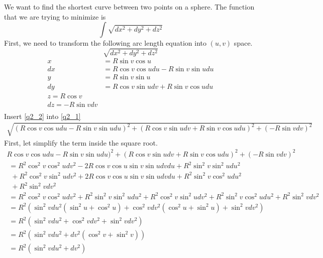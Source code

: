 We want to find the shortest curve between two points on a sphere. The function that we are trying to minimize is
\begin{equation}
\int \sqrt{dx^2 + dy^2 + dz^2}
\end{equation}
First, we need to transform the following arc length equation into $(u,v)$ space.
\begin{equation}\label{q2_1}
\sqrt{dx^2 + dy^2 + dz^2}
\end{equation}
\begin{equation}\label{q2_2}
\begin{aligned}
x &= R \sin v \cos u\\
dx &= R \cos v \cos u du - R \sin v \sin u du\\
y &= R \sin v \sin u\\
dy &= R \cos v \sin u dv + R \sin v \cos u du\\
z = R \cos v\\
dz = -R \sin v dv\\
\end{aligned}
\end{equation}
Insert \ref{q2_2} into \ref{q2_1}
\begin{equation}
\begin{aligned}
\sqrt{(R \cos v \cos u du - R \sin v \sin u du)^2 + (R \cos v \sin u dv + R \sin v \cos u du)^2 + (-R \sin v dv)^2}
\end{aligned}
\end{equation}
First, let simplify the term inside the square root.
\begin{equation}
\begin{aligned}
R \cos v \cos u du - R \sin v \sin u du)^2 + (R \cos v \sin u dv + R \sin v \cos u du)^2 + (-R \sin v dv)^2\\
\;= R^2 \cos^2 v \cos^2 u dv^2 - 2 R \cos v \cos u \sin v \sin u dv du + R^2 \sin^2 v \sin^2 u du^2 \\
\;\;+ R^2 \cos^2 v \sin^2 u dv^2 + 2 R \cos v \cos u \sin v \sin u dv du + R^2 \sin^2 v \cos^2 u du^2 \\
\;\;+ R^2 \sin^2 v dv^2\\
\;= R^2 \cos^2 v \cos^2 u dv^2 + R^2 \sin^2 v \sin^2 u du^2 + R^2 \cos^2 v \sin^2 u dv^2 + R^2 \sin^2 v \cos^2 u du^2 + R^2 \sin^2 v dv^2\\
\;= R^2 (\sin^2 v du^2 (\sin^2 u + \cos^2 u) + \cos^2 v dv^2(\cos^2 u + \sin^2 u) + \sin^2 v dv^2)\\
\;= R^2 (\sin^2 v du^2 + \cos^2 v dv^2 + \sin^2 v dv^2)\\
\;= R^2 (\sin^2 v du^2 + dv^2(\cos^2 v + \sin^2 v))\\
\;= R^2 (\sin^2 v du^2 + dv^2)\\
\end{aligned}
\end{equation}
